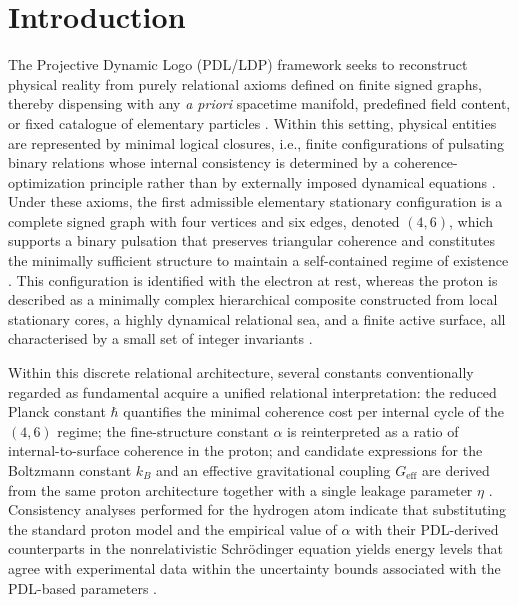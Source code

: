 \documentclass[11pt,a4paper]{article}
\theoremstyle{definition}
\newcommand{\Geff}{G_{\mathrm{eff}}}
\newcommand{\etaL}{\eta} %
\begin{document}
\section{Introduction}

The Projective Dynamic Logo (PDL/LDP) framework seeks to reconstruct physical reality from purely relational axioms defined on finite signed graphs, thereby dispensing with any \emph{a priori} spacetime manifold, predefined field content, or fixed catalogue of elementary particles \cite{PDL,PDL_introduction,PDL_Global_Mapping_Structures_Results_Open_Problems}. Within this setting, physical entities are represented by minimal logical closures, i.e., finite configurations of pulsating binary relations whose internal consistency is determined by a coherence-optimization principle rather than by externally imposed dynamical equations \cite{PDL,PDL_Global_Mapping_Structures_Results_Open_Problems}. Under these axioms, the first admissible elementary stationary configuration is a complete signed graph with four vertices and six edges, denoted $(4,6)$, which supports a binary pulsation that preserves triangular coherence and constitutes the minimally sufficient structure to maintain a self-contained regime of existence \cite{PDL,PDL_introduction}. This configuration is identified with the electron at rest, whereas the proton is described as a minimally complex hierarchical composite constructed from local stationary cores, a highly dynamical relational sea, and a finite active surface, all characterised by a small set of integer invariants \cite{PDL,Combinatorial_Proton_Architecture_PDL,PDL_Global_Mapping_Structures_Results_Open_Problems}. 

Within this discrete relational architecture, several constants conventionally regarded as fundamental acquire a unified relational interpretation: the reduced Planck constant $\hbar$ quantifies the minimal coherence cost per internal cycle of the $(4,6)$ regime; the fine-structure constant $\alpha$ is reinterpreted as a ratio of internal-to-surface coherence in the proton; and candidate expressions for the Boltzmann constant $k_B$ and an effective gravitational coupling $\Geff$ are derived from the same proton architecture together with a single leakage parameter $\etaL$ \cite{PDL,Derivation_alpha_PDL,Relational_Emergence_of_Born_s_Rule_and_a_Golden_Ratio_Active_Surface_in_PDL,A_Topological_Reformulation_in_the_Projective_Dynamic_Logo_Framework_Hierarchical_Coherence_Filtering_and_the_Exponent_18_in_PDL,Hierarchical_Coherence_Filtering_and_the_Exponent_18_in_PDL}. Consistency analyses performed for the hydrogen atom indicate that substituting the standard proton model and the empirical value of $\alpha$ with their PDL-derived counterparts in the nonrelativistic Schrödinger equation yields energy levels that agree with experimental data within the uncertainty bounds associated with the PDL-based parameters \cite{Schodinger_PDL,Sketch_derivation_Schroedinger_PDL}.
\end{document}
